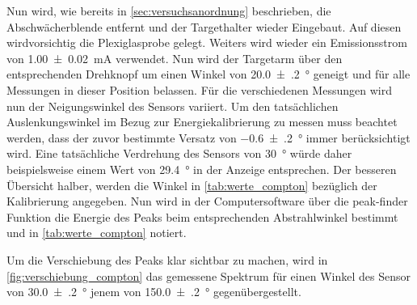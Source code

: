 \documentclass[12pt,english,ngerman]{scrartcl}
\begin{document}
Nun wird, wie bereits in \autoref{sec:versuchsanordnung} beschrieben, die
Abschwächerblende entfernt und der Targethalter wieder Eingebaut. Auf diesen
wirdvorsichtig die Plexiglasprobe gelegt. Weiters wird wieder ein
Emissionsstrom von \SI{1.00(2)}{\milli\ampere} verwendet. Nun wird der
Targetarm über den entsprechenden Drehknopf um einen Winkel von
\SI{20.0(2)}{\degree} geneigt und für alle Messungen in dieser Position
belassen. Für die verschiedenen Messungen wird nun der Neigungswinkel des
Sensors variiert. Um den tatsächlichen Auslenkungswinkel im Bezug zur
Energiekalibrierung zu messen muss beachtet werden, dass der zuvor bestimmte
Versatz von \SI{-0.6(2)}{\degree} immer berücksichtigt wird. Eine tatsächliche
Verdrehung des Sensors von \SI{30}{\degree} würde daher beispielsweise einem
Wert von \SI{29.4}{\degree} in der Anzeige entsprechen. Der besseren Übersicht
halber, werden die Winkel in \autoref{tab:werte_compton} bezüglich der
Kalibrierung angegeben. Nun wird in der Computersoftware über die peak-finder
Funktion die Energie des Peaks beim entsprechenden Abstrahlwinkel bestimmt und
in \autoref{tab:werte_compton} notiert.

\begin{table}
	\caption{}
	\label{tab:werte_compton}
	\centering
	
\end{table}

Um die Verschiebung des Peaks klar sichtbar zu machen, wird in
\autoref{fig:verschiebung_compton} das gemessene Spektrum für einen Winkel des
Sensor von \SI{30.0(2)}{\degree} jenem von \SI{150.0(2)}{\degree}
gegenübergestellt.
\end{document}
